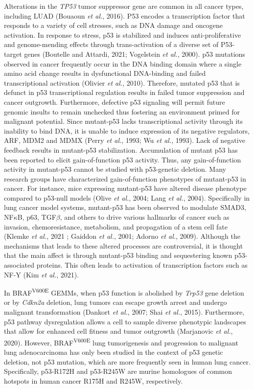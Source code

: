 Alterations in the \emph{TP53} tumor suppressor gene are common in all cancer types, including LUAD (Bouaoun \emph{et al.}, 2016). P53 encodes a transcription factor that responds to a variety of cell stresses, such as DNA damage and oncogene activation. In response to stress, p53 is stabilized and induces anti-proliferative and genome-mending effects through trans-activation of a diverse set of P53-target genes (Boutelle and Attardi, 2021; Vogelstein \emph{et al.}, 2000). p53 mutations observed in cancer frequently occur in the DNA binding domain where a single amino acid change results in dysfunctional DNA-binding and failed transcriptional activation (Olivier \emph{et al.}, 2010). Therefore, mutated p53 that is defunct in p53 transcriptional regulation results in failed tumor suppression and cancer outgrowth. Furthermore, defective p53 signaling will permit future genomic insults to remain unchecked thus fostering an environment primed for malignant potential. Since mutant-p53 lacks transcriptional activity through its inability to bind DNA, it is unable to induce expression of its negative regulators, ARF, MDM2 and MDMX (Perry \emph{et al.}, 1993; Wu \emph{et al.}, 1993). Lack of negative feedback results in mutant-p53 stabilization. Accumulation of mutant p53 has been reported to elicit gain-of-function p53 activity. Thus, any gain-of-function activity in mutant-p53 cannot be studied with p53-genetic deletion. Many research groups have characterized gain-of-function phenotypes of mutant-p53 in cancer. For instance, mice expressing mutant-p53 have altered disease phenotype compared to p53-null models (Olive \emph{et al.}, 2004; Lang \emph{et al.}, 2004). Specifically in lung cancer model systems, mutant-p53 has been observed to modulate SMAD3, NF\(\kappa\)B, p63, TGF\(\beta\), and others to drive various hallmarks of cancer such as invasion, chemoresistance, metabolism, and propagation of a stem cell fate (Klemke \emph{et al.}, 2021 ; Gaiddon \emph{et al.}, 2001; Adorno \emph{et al.}, 2009). Although the mechanisms that leads to these altered processes are controversial, it is thought that the main affect is through mutant-p53 binding and sequestering known p53-associated proteins. This often leads to activation of transcription factors such as NF-Y (Kim \emph{et al.}, 2021).

In BRAF\textsuperscript{V600E} GEMMs, when p53 function is abolished by \emph{Trp53} gene deletion or by \emph{Cdkn2a} deletion, lung tumors can escape growth arrest and undergo malignant transformation (Dankort \emph{et al.}, 2007; Shai \emph{et al.}, 2015). Furthermore, p53 pathway dysregulation allows a cell to sample diverse phenotypic landscapes that allow for enhanced cell fitness and tumor outgrowth (Marjanovic \emph{et al.}, 2020). However, BRAF\textsuperscript{V600E} lung tumorigenesis and progression to malignant lung adenocarcinoma has only been studied in the context of p53 genetic deletion, not p53 mutation, which are more frequently seen in human lung cancer. Specifically, p53-R172H and p53-R245W are murine homologues of common hotspots in human cancer R175H and R245W, respectively.

